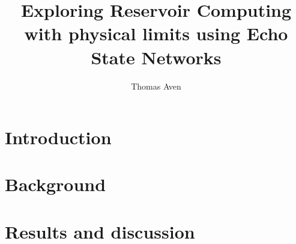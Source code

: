 \documentclass[journal]{IEEEtran}
\begin{document}
\title{Exploring Reservoir Computing with physical limits using Echo State Networks}
\author{Thomas Aven}
\date{}
\maketitle



\section{Introduction}


\section{Background}


\section{Results and discussion}




\end{document}
